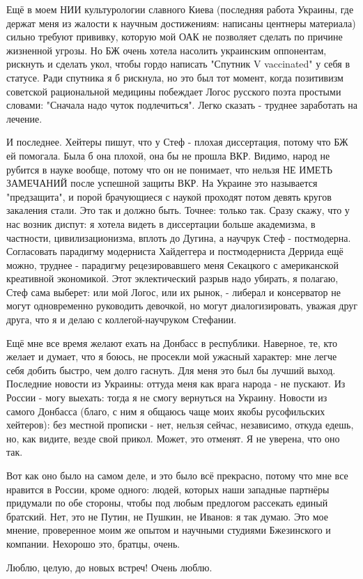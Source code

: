 Ещё в моем НИИ культурологии славного Киева (последняя работа Украины, где
держат меня из жалости к научным достижениям: написаны центнеры материала)
сильно требуют прививку, которую мой ОАК не позволяет сделать по причине
жизненной угрозы. Но БЖ очень хотела насолить украинским оппонентам, рискнуть и
сделать укол, чтобы гордо написать "Спутник V vaccinated" у себя в статусе.
Ради спутника я б рискнула, но это был тот момент, когда позитивизм советской
рациональной медицины побеждает Логос русского поэта простыми словами: "Сначала
надо чуток подлечиться". Легко сказать - труднее заработать на лечение. 

И последнее. Хейтеры пишут, что у Стеф - плохая диссертация, потому что БЖ ей
помогала. Была б она плохой, она бы не прошла ВКР. Видимо, народ не рубится в
науке вообще, потому что он не понимает, что нельзя НЕ ИМЕТЬ ЗАМЕЧАНИЙ  после
успешной защиты ВКР. На Украине это называется "предзащита", и порой
брачующиеся с наукой проходят потом девять кругов закаления стали. Это так и
должно быть. Точнее: только так. Сразу скажу, что у нас возник диспут: я хотела
видеть в диссертации больше академизма, в частности, цивилизационизма, вплоть
до Дугина, а научрук Стеф - постмодерна. Согласовать парадигму модерниста
Хайдеггера и постмодерниста Деррида ещё можно, труднее - парадигму
рецезировавшего меня Секацкого с американской креативной экономикой. Этот
эклектический разрыв надо убирать, я полагаю, Стеф сама выберет: или мой Логос,
или их рынок, - либерал и консерватор не могут одновременно руководить
девочкой, но могут диалогизировать, уважая друг друга, что я и делаю с
коллегой-научруком Стефании. 

Ещё мне все время желают ехать на Донбасс в республики. Наверное, те, кто
желает и думает, что я боюсь, не просекли мой ужасный характер: мне легче себя
добить быстро, чем долго гаснуть. Для меня это был бы лучший выход. Последние
новости из Украины: оттуда меня как врага народа - не пускают. Из России - могу
выехать: тогда я не смогу вернуться на Украину. Новости из самого Донбасса
(благо, с ним я общаюсь чаще моих якобы русофильских хейтеров): без местной
прописки - нет, нельзя сейчас, независимо, откуда едешь, но, как видите, везде
свой прикол. Может, это отменят. Я не уверена, что оно так.

Вот как оно было на самом деле, и это было всё прекрасно, потому что мне все
нравится в России, кроме одного: людей, которых наши западные партнёры
придумали по обе стороны, чтобы под любым предлогом рассекать единый братский.
Нет, это не Путин, не Пушкин, не Иванов: я так думаю. Это мое мнение,
проверенное моим же опытом и научными студиями Бжезинского и компании. Нехорошо
это, братцы, очень. 

Люблю, целую, до новых встреч! Очень люблю.

